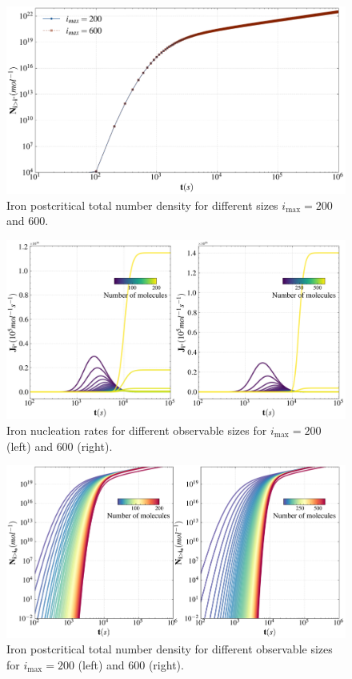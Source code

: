 \begin{figure}[H]
    \centering
    \includegraphics[width=1.1\linewidth]{postcritical_number_cr.png}
    \caption{Iron postcritical total number density for different sizes $i_{\text{max}} = 200$ and $600$.}
    \label{fig:postcritical_number_fe}
\end{figure}

\begin{figure}[H]
    \centering
    \includegraphics[width=1.1\linewidth]{postcritical_nucleation_rate_cr_particles_comparison.png}
    \caption{Iron nucleation rates for different observable sizes for $i_{\text{max}} = 200$ (left) and $600$ (right).}
    \label{fig:postcritical_nucleation_rate_fe_particles_comparison}
\end{figure}

\begin{figure}[H]
    \centering
    \includegraphics[width=1.1\linewidth]{postcritical_number_density_cr_particles_comparison.png}
    \caption{Iron postcritical total number density for different observable sizes for $i_{\text{max}} = 200$ (left) and $600$ (right).}
    \label{fig:postcritical_number_density_fe_particles_comparison}
\end{figure}

